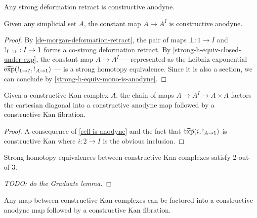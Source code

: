 \documentclass[reqno,10pt,a4paper,oneside]{amsart}
\begin{document}
\begin{corollary}
\label{strong-deformation-retract-is-anodyne}
Any strong deformation retract is constructive anodyne.
\end{corollary}

\begin{corollary}
\label{refl-is-anodyne}
Given any simplicial set $A$, the constant map $A \to A^I$ is constructive anodyne.
\end{corollary}

\begin{proof}
By \cref{de-morgan-deformation-retract}, the pair of maps $\bot : 1 \to I$ and $\mathord{!}_{I \to 1} : I \to 1$ forms a co-strong deformation retract.
By \cref{strong-h-equiv-closed-under-exp}, the constant map $A \to A^I$ --- represented as the Leibniz exponential $\operatorname{\widehat{exp}}(\mathord{!}_{1 \to I}, \mathord{!}_{A \to 1})$ --- is a strong homotopy equivalence.
Since it is also a section, we can conclude by \cref{strong-h-equiv-mono-is-anodyne}.
\end{proof}

\begin{corollary}
\label{path-object}
Given a constructive Kan complex $A$, the chain of maps $A \to A^I \to A \times A$ factors the cartesian diagonal into a constructive anodyne map followed by a constructive Kan fibration.
\end{corollary}

\begin{proof}
A consequence of \cref{refl-is-anodyne} and the fact that $\operatorname{\widehat{exp}}(i, \mathord{!}_{A \to 1})$ is constructive Kan where $i : 2 \to I$ is the obvious inclusion.
\end{proof}

\begin{lemma}
\label{2-out-of-3}
Strong homotopy equivalences between constructive Kan complexes satisfy 2-out-of-3. 
\end{lemma}

\begin{proof}
[TODO: do the Graduate lemma] 
\end{proof}

\begin{proposition}
\label{fibrant-cod-factorization}
Any map between constructive Kan complexes can be factored into a constructive anodyne map followed by a constructive Kan fibration.
\end{proposition}
\end{document}
